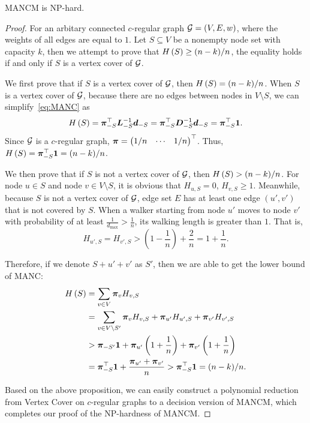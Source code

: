 \documentclass[sigconf]{acmart}
\begin{document}
\begin{theorem}\label{thm:np-hard}
    MANCM is NP-hard.
\end{theorem}
\begin{proof}
    For an arbitary connected \(c\)-regular graph \(\mathcal{G}=(V,E,w)\), where the weights of all edges are equal to \(1\).
    Let \(S\subseteq V\) be a nonempty node set with capacity \(k\), then we attempt to prove that \(H\left(S\right)\ge (n-k)/n\), the equality holds if and only if \(S\) is a vertex cover of \(\mathcal{G}\).

    We first prove that if \(S\) is a vertex cover of \(\mathcal{G}\), then \(H\left(S\right)=(n-k)/n\).
    When \(S\) is a vertex cover of \(\mathcal{G}\), because there are no edges between nodes in \(V\setminus S\), we can simplify~\eqref{eq:MANC} as
    \[H\left(S\right)=\boldsymbol{\pi}_{-S}^\top\boldsymbol{L}_{-S}^{-1}\boldsymbol{d}_{-S}=\boldsymbol{\pi}_{-S}^\top\boldsymbol{D}_{-S}^{-1}\boldsymbol{d}_{-S}=\boldsymbol{\pi}_{-S}^\top\boldsymbol{1}.\]
    Since \(\mathcal{G}\) is a \(c\)-regular graph, \(\boldsymbol{\pi}=\begin{pmatrix}1/n&\cdots&1/n\end{pmatrix}^\top\).
    Thus, \(H\left(S\right)=\boldsymbol{\pi}_{-S}^\top\boldsymbol{1}=(n-k)/n\).

    We then prove that if \(S\) is not a vertex cover of \(\mathcal{G}\), then \(H\left(S\right)>(n-k)/n\).
    For node \(u\in S\) and node \(v\in V\setminus S\), it is obvious that \(H_{u,S}=0\), \(H_{v,S}\ge1\).
    Meanwhile, because \(S\) is not a vertex cover of \(\mathcal{G}\), edge set \(E\) has at least one edge \((u',v')\) that is not covered by \(S\).
    When a walker starting from node \(u'\) moves to node \(v'\) with probability of at least \(\frac{1}{d_{\max}}>\frac{1}{n}\), its walking length is greater than \(1\).
    That is,
    \[H_{u',S}=H_{v',S}>(1-\frac{1}{n})+\frac{2}{n}=1+\frac{1}{n}.\]

    Therefore, if we denote \(S+u'+v'\) as \(S'\), then we are able to get the lower bound of MANC:
    \begin{align*}
        H\left(S\right) & =\sum_{v\in V}\boldsymbol{\pi}_vH_{v,S}                                                          \\
                 & =\sum_{v\in V\setminus S'}\boldsymbol{\pi}_vH_{v,S}+\boldsymbol{\pi}_{u'}H_{u',S}+\boldsymbol{\pi}_{v'}H_{v',S}      \\
                 & >\boldsymbol{\pi}_{-S'}\boldsymbol{1}+\boldsymbol{\pi}_{u'}\left( 1+\frac{1}{n} \right)+\boldsymbol{\pi}_{v'}\left( 1+\frac{1}{n} \right) \\
                 & =\boldsymbol{\pi}_{-S}^\top\boldsymbol{1}+\frac{\boldsymbol{\pi}_{u'}+\boldsymbol{\pi}_{v'}}n
        >\boldsymbol{\pi}_{-S}^\top\boldsymbol{1}=(n-k)/n.
    \end{align*}

    Based on the above proposition, we can easily construct a polynomial reduction from Vertex Cover on \(c\)-regular graphs to a decision version of MANCM, which completes our proof of the NP-hardness of MANCM.

\end{proof}
\end{document}

